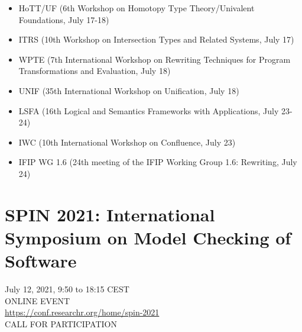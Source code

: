 \documentclass[prodmode,acmtecs]{acmsmall} %
\begin{document}
\begin{itemize}
\begin{itemize}\item  HoTT/UF (6th Workshop on Homotopy Type Theory/Univalent Foundations, July 17-18) 
\item  ITRS (10th Workshop on Intersection Types and Related Systems, July 17) 
\item  WPTE (7th International Workshop on Rewriting Techniques for Program Transformations and Evaluation, July 18) 
\item  UNIF (35th International Workshop on Unification, July 18) 
\item  LSFA (16th Logical and Semantics Frameworks with Applications, July 23-24) 
\item  IWC (10th International Workshop on Confluence, July 23) 
\item  IFIP WG 1.6 (24th meeting of the IFIP Working Group 1.6: Rewriting, July 24)
\end{itemize} 
\end{itemize}\section{SPIN 2021: International Symposium on Model Checking of Software}\label{SPIN2021}  July 12, 2021, 9:50 to 18:15 CEST\\ 
  ONLINE EVENT\\ 
  \href{https://conf.researchr.org/home/spin-2021}{https://conf.researchr.org/home/spin-2021}\\ 
CALL FOR PARTICIPATION 
\end{document}
